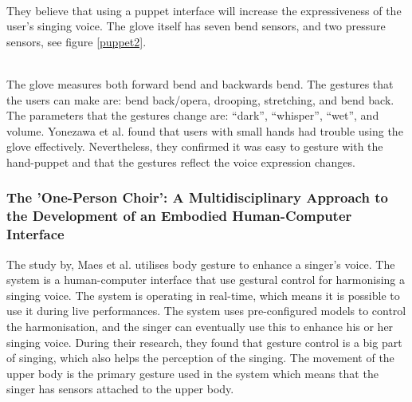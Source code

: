 \begin{minipage}{\linewidth}%
\label{puppet1}
\end{minipage}\\

They believe that using a puppet interface will increase the expressiveness of the user’s singing voice. The glove itself has seven bend sensors, and two pressure sensors, see figure \ref{puppet2}. 

\begin{minipage}{\linewidth}%
\label{puppet2}
\end{minipage}\\

The glove measures both forward bend and backwards bend. The gestures that the users can make are: bend back/opera, drooping, stretching, and bend back. The parameters that the gestures change are: “dark”, “whisper”, “wet”, and volume. Yonezawa et al. found that users with small hands had trouble using the glove effectively. Nevertheless, they confirmed it was easy to gesture with the hand-puppet and that the gestures reflect the voice expression changes.

\subsubsection{The 'One-Person Choir': A Multidisciplinary Approach to the Development of an Embodied Human-Computer Interface}
The study by, Maes et al. \citep{Maes_2011} utilises body gesture to enhance a singer's voice. The system is a human-computer interface that use gestural control for harmonising a singing voice. The system is operating in real-time, which means it is possible to use it during live performances. The system uses pre-configured models to control the harmonisation, and the singer can eventually use this to enhance his or her singing voice. 
During their research, they found that gesture control is a big part of singing, which also helps the perception of the singing. The movement of the upper body is the primary gesture used in the system which means that the singer has sensors attached to the upper body.

